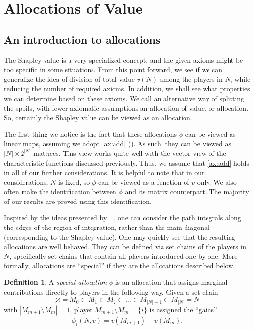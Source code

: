 \documentclass[12pt,letterpaper,final]{article}
\theoremstyle{plain}
\theoremstyle{plain}
\theoremstyle{plain}
\theoremstyle{plain}
\theoremstyle{plain}
\theoremstyle{plain}
\theoremstyle{plain}
\theoremstyle{definition}
\newtheorem{definition}{Definition}[section]
\theoremstyle{definition}
\theoremstyle{definition}
\theoremstyle{definition}
\theoremstyle{definition}
\theoremstyle{remark}
\theoremstyle{remark}
\theoremstyle{remark}
\theoremstyle{remark}
\begin{document}
 \section{Allocations of Value}
\label{cha:allocations-value}

\subsection{An introduction to allocations}

The Shapley value is a very specialized concept, and the given axioms
might be too specific in some situations. From this point forward, we
see if we can
generalize the idea of division of total value \(v(N)\) among the
players in \(N\), while reducing the number
of required axioms. In addition, we shall see what properties we can
determine based on these axioms. We call an alternative way of splitting the
spoils, with fewer axiomatic assumptions an allocation of value, or allocation.
So, certainly the Shapley value can be viewed as an allocation.

The first thing we notice is the fact that these
allocations \(\phi\) can be viewed as linear maps, assuming we adopt
\cref{ax:add} (). As such, they can be viewed 
as \(|N| \times 2^{|N|}\) matrices. This view works quite well with
the vector view of the characteristic functions discussed
previously. Thus, we assume that \cref{ax:add} holds in all of our
further 
considerations. It is helpful to note that in our considerations,
\(N\) is fixed, so \(\phi\) can be viewed as a function of \(v\)
only. We also often make the identification between \(\phi\) and
its matrix counterpart. The majority of our results are proved using
this identification.

Inspired by the ideas presented by~\citeauthor{Owen72}~\cite{Owen72},
one can consider the path integrals along the edges of the region of
integration, rather than the main diagonal (corresponding to the
Shapley value). One may quickly see that the resulting allocations are
well behaved. They can be defined via set chains of the
players in \(N\), specifically set chains that contain all players
introduced one by one.  More formally, allocations are ``special'' if
they are the allocations described below.
\begin{definition}
  A \emph{special allocation} \(\phi\) is an allocation that
  assigns marginal contributions directly to players in the following
  way. Given a set chain
  \[
    \varnothing = M_0 \subset M_1 \subset M_2\subset \ldots \subset
    M_{|N|-1} \subset M_{|N|}=N
  \]
  with \(\left|M_{m+1}\setminus M_m\right| = 1\), player
  \(M_{m+1}\setminus M_m = \{i\}\) is assigned the ``gains''
  \[
    \phi_{i}(N,v) = v(M_{m+1}) - v(M_m).
  \]
\end{definition}
\end{document}
